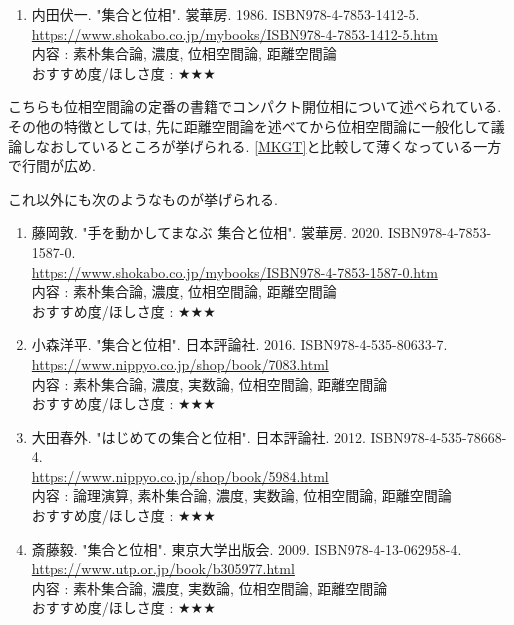 \documentclass[10pt,a4paper]{jsarticle}
\begin{document}
    \begin{enumerate}
        \renewcommand{\theenumi}{[GT\arabic{enumi}]}
        \renewcommand{\labelenumi}{\theenumi}
        \setcounter{enumi}{1}
        \item \label{UFGT} 内田伏一. "集合と位相". 裳華房. 1986. ISBN978-4-7853-1412-5. \\
        \url{https://www.shokabo.co.jp/mybooks/ISBN978-4-7853-1412-5.htm} \\
        内容 : 素朴集合論, 濃度, 位相空間論, 距離空間論\\
        おすすめ度/ほしさ度 : $\bigstar \bigstar \bigstar $
    \end{enumerate}\par
    こちらも位相空間論の定番の書籍でコンパクト開位相について述べられている. その他の特徴としては, 先に距離空間論を述べてから位相空間論に一般化して議論しなおしているところが挙げられる. \ref{MKGT}と比較して薄くなっている一方で行間が広め. \par
    これ以外にも次のようなものが挙げられる. 
    \begin{enumerate}
        \renewcommand{\theenumi}{[GT\arabic{enumi}]}
        \renewcommand{\labelenumi}{\theenumi}
        \setcounter{enumi}{2}
        \item \label{FAGT} 藤岡敦. "手を動かしてまなぶ 集合と位相". 裳華房. 2020. ISBN978-4-7853-1587-0. \\
        \url{https://www.shokabo.co.jp/mybooks/ISBN978-4-7853-1587-0.htm} \\
        内容 : 素朴集合論, 濃度, 位相空間論, 距離空間論\\
        おすすめ度/ほしさ度 : $\bigstar \bigstar \bigstar $
        \item \label{KYGT} 小森洋平. "集合と位相". 日本評論社. 2016. ISBN978-4-535-80633-7. \\
        \url{https://www.nippyo.co.jp/shop/book/7083.html} \\
        内容 : 素朴集合論, 濃度, 実数論, 位相空間論, 距離空間論\\
        おすすめ度/ほしさ度 : $\bigstar \bigstar \bigstar $
        \item \label{OHGT} 大田春外. "はじめての集合と位相". 日本評論社. 	2012. ISBN978-4-535-78668-4. \\
        \url{https://www.nippyo.co.jp/shop/book/5984.html} \\
        内容 : 論理演算, 素朴集合論, 濃度, 実数論, 位相空間論, 距離空間論\\
        おすすめ度/ほしさ度 : $\bigstar \bigstar \bigstar $
        \item \label{STGT} 斎藤毅. "集合と位相". 東京大学出版会. 2009. ISBN978-4-13-062958-4. \\
        \url{https://www.utp.or.jp/book/b305977.html} \\
        内容 : 素朴集合論, 濃度, 実数論, 位相空間論, 距離空間論\\
        おすすめ度/ほしさ度 : $\bigstar \bigstar \bigstar $
    \end{enumerate}\par
\end{document}

